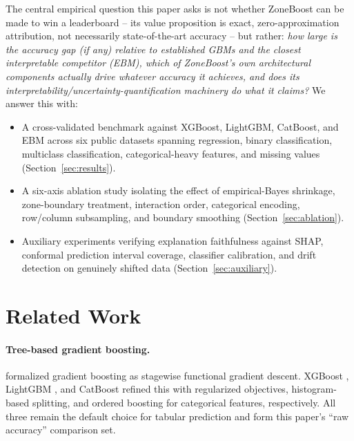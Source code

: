 \documentclass[11pt]{article}
\begin{document}
The central empirical question this paper asks is not whether ZoneBoost can
be made to win a leaderboard -- its value proposition is exact,
zero-approximation attribution, not necessarily state-of-the-art accuracy --
but rather: \emph{how large is the accuracy gap (if any) relative to
established GBMs and the closest interpretable competitor (EBM), which of
ZoneBoost's own architectural components actually drive whatever accuracy it
achieves, and does its interpretability/uncertainty-quantification machinery
do what it claims?} We answer this with:

\begin{itemize}
  \item A cross-validated benchmark against XGBoost, LightGBM, CatBoost, and
    EBM across six public datasets spanning regression, binary
    classification, multiclass classification, categorical-heavy features,
    and missing values (Section~\ref{sec:results}).
  \item A six-axis ablation study isolating the effect of empirical-Bayes
    shrinkage, zone-boundary treatment, interaction order, categorical
    encoding, row/column subsampling, and boundary smoothing
    (Section~\ref{sec:ablation}).
  \item Auxiliary experiments verifying explanation faithfulness against
    SHAP, conformal prediction interval coverage, classifier calibration, and
    drift detection on genuinely shifted data (Section~\ref{sec:auxiliary}).
\end{itemize}

\section{Related Work}
\label{sec:related}

\paragraph{Tree-based gradient boosting.} \citet{friedman2001greedy}
formalized gradient boosting as stagewise functional gradient descent.
XGBoost \citep{chen2016xgboost}, LightGBM \citep{ke2017lightgbm}, and CatBoost
\citep{prokhorenkova2018catboost} refined this with regularized objectives,
histogram-based splitting, and ordered boosting for categorical features,
respectively. All three remain the default choice for tabular prediction and
form this paper's ``raw accuracy'' comparison set.
\end{document}
